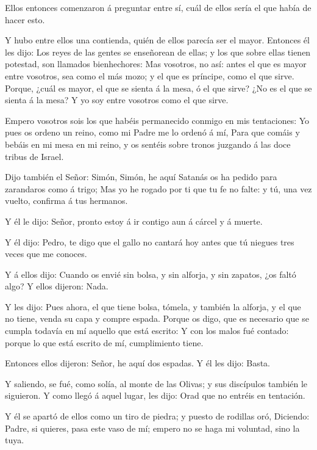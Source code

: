 Ellos entonces comenzaron á preguntar entre sí, cuál de
ellos sería el que había de hacer esto.

 Y hubo entre ellos una contienda, quién de ellos parecía
ser el mayor.  Entonces él les dijo: Los reyes de las
gentes se enseñorean de ellas; y los que sobre ellas tienen potestad,
son llamados bienhechores:  Mas vosotros, no así: antes el
que es mayor entre vosotros, sea como el más mozo; y el que es príncipe,
como el que sirve.  Porque, ¿cuál es mayor, el que se
sienta á la mesa, ó el que sirve? ¿No es el que se sienta á la mesa? Y
yo soy entre vosotros como el que sirve.

 Empero vosotros sois los que habéis permanecido conmigo en
mis tentaciones:  Yo pues os ordeno un reino, como mi Padre
me lo ordenó á mí,  Para que comáis y bebáis en mi mesa en
mi reino, y os sentéis sobre tronos juzgando á las doce tribus de
Israel.

 Dijo también el Señor: Simón, Simón, he aquí Satanás os ha
pedido para zarandaros como á trigo;  Mas yo he rogado por
ti que tu fe no falte: y tú, una vez vuelto, confirma á tus hermanos.

 Y él le dijo: Señor, pronto estoy á ir contigo aun á
cárcel y á muerte.

 Y él dijo: Pedro, te digo que el gallo no cantará hoy
antes que tú niegues tres veces que me conoces.

 Y á ellos dijo: Cuando os envié sin bolsa, y sin alforja,
y sin zapatos, ¿os faltó algo? Y ellos dijeron: Nada.

 Y les dijo: Pues ahora, el que tiene bolsa, tómela, y
también la alforja, y el que no tiene, venda su capa y compre espada.
 Porque os digo, que es necesario que se cumpla todavía en
mí aquello que está escrito: Y con los malos fué contado: porque lo que
está escrito de mí, cumplimiento tiene.

 Entonces ellos dijeron: Señor, he aquí dos espadas. Y él
les dijo: Basta.

 Y saliendo, se fué, como solía, al monte de las Olivas; y
sus discípulos también le siguieron.  Y como llegó á aquel
lugar, les dijo: Orad que no entréis en tentación.

 Y él se apartó de ellos como un tiro de piedra; y puesto
de rodillas oró,  Diciendo: Padre, si quieres, pasa este
vaso de mí; empero no se haga mi voluntad, sino la tuya.

